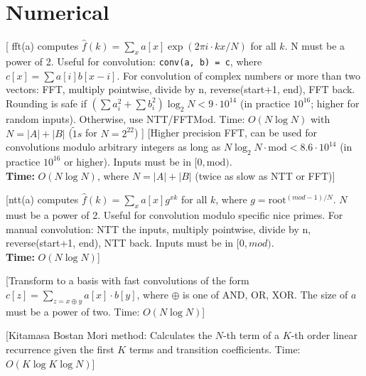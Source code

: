 \chapter{Numerical}

[
   fft(a) computes $\hat f(k) = \sum_x a[x] \exp(2\pi i \cdot k x / N)$ for all $k$. N must be a power of 2.
   Useful for convolution:
   \texttt{conv(a, b) = c}, where $c[x] = \sum a[i]b[x-i]$.
   For convolution of complex numbers or more than two vectors: FFT, multiply
   pointwise, divide by n, reverse(start+1, end), FFT back.
   Rounding is safe if $(\sum a_i^2 + \sum b_i^2)\log_2{N} < 9\cdot10^{14}$
   (in practice $10^{16}$; higher for random inputs).
   Otherwise, use NTT/FFTMod.
   Time: $O(N \log N)$ with $N = |A|+|B|$ ($\tilde 1s$ for $N=2^{22}$)
]
%
[Higher precision FFT, can be used for convolutions modulo arbitrary integers as long as $N\log_2N\cdot \text{mod} < 8.6 \cdot 10^{14}$ (in practice $10^{16}$ or higher). Inputs must be in {$[0, \text{mod})$}. \\
\textbf{Time:} {$O(N \log N)$}, where $N = |A|+|B|$ (twice as slow as NTT or FFT)]

%
[ntt(a) computes $\hat f(k) = \sum_x a[x] g^{xk}$ for all $k$, where $g=\text{root}^{(mod-1)/N}$. $N$ must be a power of 2. Useful for convolution modulo specific nice primes. For manual convolution: NTT the inputs, multiply pointwise, divide by n, reverse(start+1, end), NTT back. Inputs must be in {$[0, mod)$}. \\
\textbf{Time:} $O(N \log N)$]


[Transform to a basis with fast convolutions of the form
 $\displaystyle c[z] = \sum\nolimits_{z = x \oplus y} a[x] \cdot b[y]$,
 where $\oplus$ is one of AND, OR, XOR. The size of $a$ must be a power of two.
 Time: $O(N \log N)$]



[Kitamasa Bostan Mori method: Calculates the $N$-th term of a $K$-th order linear recurrence given the first $K$ terms and transition coefficients. Time: $O(K \log K \log N)$]